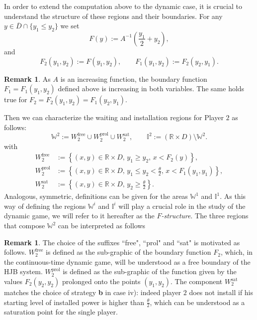 \documentclass[10pt]{article}
\numberwithin{equation}{section}
\theoremstyle{plain}
\numberwithin{theorem}{section}
\theoremstyle{definition}
\newtheorem{remark}[theorem]{Remark}
\def \R {\mathbb{R}}
\newcommand{\<}{\langle}
\renewcommand{\>}{\rangle}
\renewcommand{\(}{\left(}
\renewcommand{\)}{\right)}
\def \R  {{\mathbb {R}}}
\def \R {{\mathbb {R}}}
\begin{document}
{{In order to extend the computation above to the dynamic case, it is crucial to understand the structure of these regions and {their} boundaries. 
For any {$y\in \overline{D}\cap \{y_1\le y_2\}$} we set {
\begin{equation}\label{eq:onestep_freebound}
{F}(y):=A^{-1}\left(\frac{y_1}{2}+y_2\right),
\end{equation}
and 
\begin{equation}%
F_2(y_1,y_2) := F(y_1,y_2), \qquad F_1(y_1,y_2) := F_2(y_2,y_1).
\end{equation}}
\begin{remark}\label{rem:increasing_F}
As $A$ is an increasing function, the boundary function $F_1 = F_1(y_1,y_2)$ defined above is increasing in both variables. The same holds true for $F_2 = F_2(y_1,y_2) = F_1(y_2,y_1)$.
\end{remark}
Then we can characterize the waiting and installation regions for {Player $2$} as follows:
{\begin{equation}\label{eq:onestep_wait}
\mathbb{W}^2:=W^{\text{free}}_{{2}}\cup W^{\text{prol}}_{{2}}\cup W^{\text{sat}}_{2}, \qquad \mathbb{I}^2:=(\R\times  {D} )\setminus \mathbb{W}^2.
\end{equation}
with
\begin{align*}
W^{\text{free}}_{{2}}&:=\left\{(x,y)\in \R\times {D}, \, y_1\geq y_2, \, x < F_2(y)\right\},\\
W^{\text{prol}}_{{2}}&:=\left\{(x,y)\in \R\times {D}, \, {y_1 \leq y_2 <  \frac{\theta}{2}}, \, x<F_1(y_1,y_1)\right\},\\
W^{\text{sat}}_{2}&:=\left\{(x,y)\in \R\times {D}, \, y_2\geq \frac{\theta}{2}\right\}.
\end{align*}}
Analogous, symmetric, definitions can be given for the areas $\mathbb{W}^1$ and $\mathbb{I}^1$. As this way of defining the regions $\mathbb{W}^i$ and $\mathbb{I}^i$ will play a crucial role in the study of the dynamic game, we will refer to it hereafter as the \emph{$F$-structure}. 
 The three regions that compose $\mathbb{W}^2$ can be interpreted as follows
\begin{remark}\label{rem:interpretation_W}
The choice of the suffixes ``free", ``prol" and ``sat" is motivated as follows. {$W^{\text{free}}_2$ is defined as the sub-graphic of the boundary function $F_2$, which, in the continuous-time dynamic game, will be understood as a free boundary of the HJB system. $W^{\text{prol}}_{2}$ is defined as the sub-graphic of the function given by the values $F_2(y_2,y_2)$ prolonged onto the points $(y_1,y_2)$. The component $W^{\text{sat}}_{2}$ matches the choice of strategy \textbf{b} in case iv): indeed player $2$ does not install if his starting level of installed power is higher than $\frac{\theta}{2}$, which can be understood as a saturation point for the single player.}

\end{remark}}}
\end{document}
